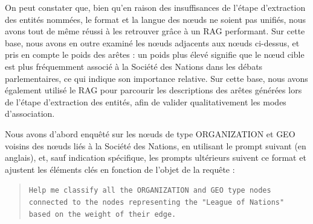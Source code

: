 \documentclass[a4paper,twoside,12pt]{book}
\begin{document}
On peut constater que, bien qu'en raison des insuffisances de l'étape d'extraction des entités nommées, le format et la langue des nœuds ne soient pas unifiés, nous avons tout de même réussi à les retrouver grâce à un RAG performant. Sur cette base, nous avons en outre examiné les nœuds adjacents aux nœuds ci-dessus, et pris en compte le poids des arêtes : un poids plus élevé signifie que le nœud cible est plus fréquemment associé à la Société des Nations dans les débats parlementaires, ce qui indique son importance relative. Sur cette base, nous avons également utilisé le RAG pour parcourir les descriptions des arêtes générées lors de l'étape d'extraction des entités, afin de valider qualitativement les modes d'association.

Nous avons d'abord enquêté sur les nœuds de type ORGANIZATION et GEO voisins des nœuds liés à la Société des Nations, en utilisant le prompt suivant (en anglais), et, sauf indication spécifique, les prompts ultérieurs suivent ce format et ajustent les éléments clés en fonction de l'objet de la requête :

\begin{quote}
\texttt{Help me classify all the ORGANIZATION and GEO type nodes connected to the nodes representing the "League of Nations" based on the weight of their edge.}
\end{quote}
\end{document}
